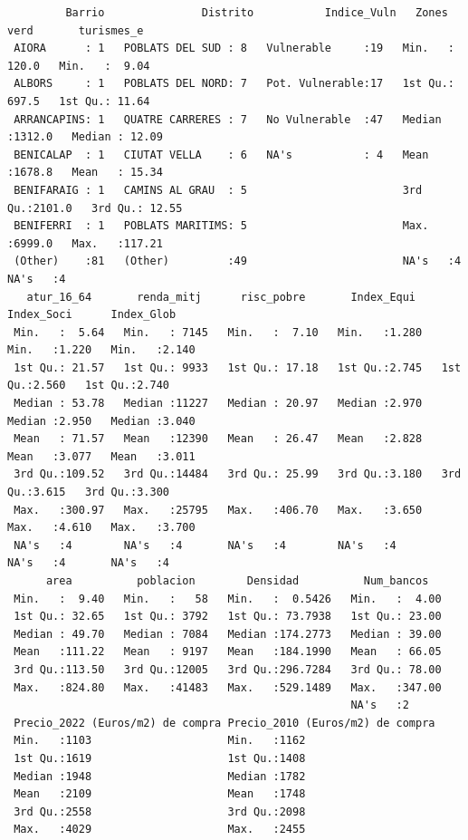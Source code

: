 \documentclass[notspecified,article,submit,moreauthors,pdftex]{Definitions/mdpi}
\begin{document}
\begin{verbatim}
         Barrio               Distrito           Indice_Vuln   Zones verd       turismes_e    
 AIORA      : 1   POBLATS DEL SUD : 8   Vulnerable     :19   Min.   : 120.0   Min.   :  9.04  
 ALBORS     : 1   POBLATS DEL NORD: 7   Pot. Vulnerable:17   1st Qu.: 697.5   1st Qu.: 11.64  
 ARRANCAPINS: 1   QUATRE CARRERES : 7   No Vulnerable  :47   Median :1312.0   Median : 12.09  
 BENICALAP  : 1   CIUTAT VELLA    : 6   NA's           : 4   Mean   :1678.8   Mean   : 15.34  
 BENIFARAIG : 1   CAMINS AL GRAU  : 5                        3rd Qu.:2101.0   3rd Qu.: 12.55  
 BENIFERRI  : 1   POBLATS MARITIMS: 5                        Max.   :6999.0   Max.   :117.21  
 (Other)    :81   (Other)         :49                        NA's   :4        NA's   :4       
   atur_16_64       renda_mitj      risc_pobre       Index_Equi      Index_Soci      Index_Glob   
 Min.   :  5.64   Min.   : 7145   Min.   :  7.10   Min.   :1.280   Min.   :1.220   Min.   :2.140  
 1st Qu.: 21.57   1st Qu.: 9933   1st Qu.: 17.18   1st Qu.:2.745   1st Qu.:2.560   1st Qu.:2.740  
 Median : 53.78   Median :11227   Median : 20.97   Median :2.970   Median :2.950   Median :3.040  
 Mean   : 71.57   Mean   :12390   Mean   : 26.47   Mean   :2.828   Mean   :3.077   Mean   :3.011  
 3rd Qu.:109.52   3rd Qu.:14484   3rd Qu.: 25.99   3rd Qu.:3.180   3rd Qu.:3.615   3rd Qu.:3.300  
 Max.   :300.97   Max.   :25795   Max.   :406.70   Max.   :3.650   Max.   :4.610   Max.   :3.700  
 NA's   :4        NA's   :4       NA's   :4        NA's   :4       NA's   :4       NA's   :4      
      area          poblacion        Densidad          Num_bancos    
 Min.   :  9.40   Min.   :   58   Min.   :  0.5426   Min.   :  4.00  
 1st Qu.: 32.65   1st Qu.: 3792   1st Qu.: 73.7938   1st Qu.: 23.00  
 Median : 49.70   Median : 7084   Median :174.2773   Median : 39.00  
 Mean   :111.22   Mean   : 9197   Mean   :184.1990   Mean   : 66.05  
 3rd Qu.:113.50   3rd Qu.:12005   3rd Qu.:296.7284   3rd Qu.: 78.00  
 Max.   :824.80   Max.   :41483   Max.   :529.1489   Max.   :347.00  
                                                     NA's   :2       
 Precio_2022 (Euros/m2) de compra Precio_2010 (Euros/m2) de compra
 Min.   :1103                     Min.   :1162                    
 1st Qu.:1619                     1st Qu.:1408                    
 Median :1948                     Median :1782                    
 Mean   :2109                     Mean   :1748                    
 3rd Qu.:2558                     3rd Qu.:2098                    
 Max.   :4029                     Max.   :2455                    

\end{verbatim}
\end{document}
